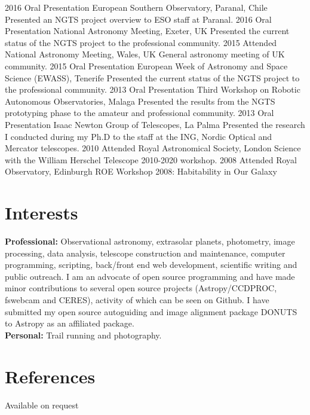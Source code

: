 \documentclass[print]{friggeri-cv} %
\begin{document}
\begin{entrylist}
\entry
{\small 2016}
{\small Oral Presentation}
{\small European Southern Observatory, Paranal, Chile}
{\small Presented an NGTS project overview to ESO staff at Paranal.}
\entry
{\small 2016}
{\small Oral Presentation}
{\small National Astronomy Meeting, Exeter, UK}
{\small Presented the current status of the NGTS project to the professional community.}
\entry
{\small 2015}
{\small Attended}
{\small National Astronomy Meeting, Wales, UK}
{\small General astronomy meeting of UK community.}
\entry
{\small 2015}
{\small Oral Presentation}
{\small European Week of Astronomy and Space Science (EWASS), Tenerife}
{\small Presented the current status of the NGTS project to the professional community.}
\entry
{\small 2013}
{\small Oral Presentation}
{\small Third Workshop on Robotic Autonomous Observatories, Malaga}
{\small Presented the results from the NGTS prototyping phase to the amateur and professional community.}
\entry
{\small 2013}
{\small Oral Presentation}
{\small Isaac Newton Group of Telescopes, La Palma}
{\small Presented the research I conducted during my Ph.D to the staff at the ING, Nordic Optical and Mercator telescopes.}
\entry
{\small 2010}
{\small Attended}
{\small Royal Astronomical Society, London}
{\small Science with the William Herschel Telescope 2010-2020 workshop.}
\entry
{\small 2008}
{\small Attended}
{\small Royal Observatory, Edinburgh}
{\small ROE Workshop 2008: Habitability in Our Galaxy}
\end{entrylist}

\section{Interests}

{\small \textbf{Professional:} Observational astronomy, extrasolar planets, photometry, image processing, data analysis, telescope construction and maintenance, computer programming, scripting, back/front end web development, scientific writing and public outreach. I am an advocate of open source programming and have made minor contributions to several open source projects (Astropy/CCDPROC, fswebcam and CERES), activity of which can be seen on Github. I have submitted my open source autoguiding and image alignment package DONUTS to Astropy as an affiliated package.}\\
{\small \textbf{Personal:} Trail running and photography.}


\section{References}
{\small  Available on request}
\end{document}
